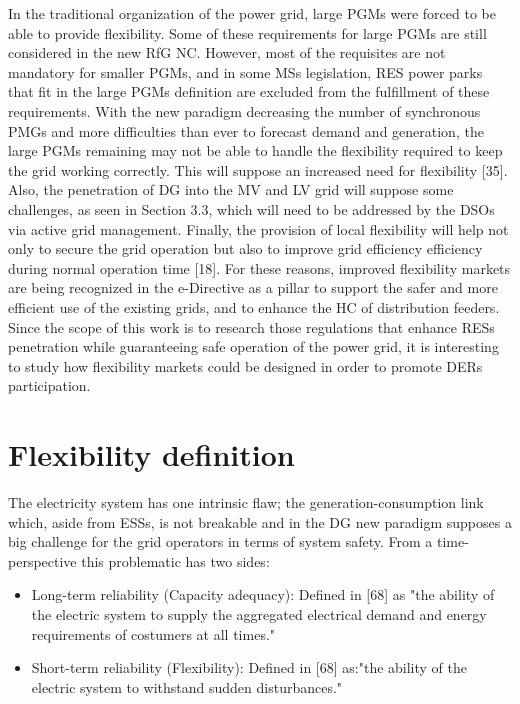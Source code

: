 In the traditional organization of the power grid, large PGMs were forced to be able to provide
flexibility. Some of these requirements for large PGMs are still considered in the new RfG NC.
However, most of the requisites are not mandatory for smaller PGMs, and in some MSs legislation,
RES power parks that fit in the large PGMs definition are excluded from the fulfillment
of these requirements. With the new paradigm decreasing the number of synchronous PMGs
and more difficulties than ever to forecast demand and generation, the large PGMs remaining
may not be able to handle the flexibility required to keep the grid working correctly. This will
suppose an increased need for flexibility [35]. Also, the penetration of DG into the MV and
LV grid will suppose some challenges, as seen in Section 3.3, which will need to be addressed
by the DSOs via active grid management. Finally, the provision of local flexibility will help not
only to secure the grid operation but also to improve grid efficiency efficiency during normal
operation time [18].
For these reasons, improved flexibility markets are being recognized in the e-Directive as a
pillar to support the safer and more efficient use of the existing grids, and to enhance the HC of
distribution feeders. Since the scope of this work is to research those regulations that enhance
RESs penetration while guaranteeing safe operation of the power grid, it is interesting to study
how flexibility markets could be designed in order to promote DERs participation.


\section{Flexibility definition}
The electricity system has one intrinsic flaw; the generation-consumption link which, aside from
ESSs, is not breakable and in the DG new paradigm supposes a big challenge for the grid operators
in terms of system safety. From a time-perspective this problematic has two sides:
\begin{itemize}
\item Long-term reliability (Capacity adequacy): Defined in [68] as "the ability of the electric
system to supply the aggregated electrical demand and energy requirements of costumers at all
times."
\item Short-term reliability (Flexibility): Defined in [68] as:"the ability of the electric system to
withstand sudden disturbances."
\end{itemize}

